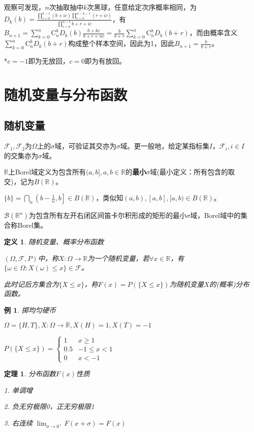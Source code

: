 \documentclass[a4paper,UTF8,fontset=windows]{ctexart}
\newtheorem{thm}{定理}[section]
\newtheorem{exmp}{例}[section]
\newtheorem{defi}{定义}[section]
\begin{document}
观察可发现，$n$次抽取抽中$k$次黑球，任意给定次序概率相同，为$D_k(b)=\frac{\prod_{i=0}^{k-1}(b+ic)\prod_{i=0}^{n-k-1}(r+ic)}{\prod_{i=0}^{n-1}b+r+ic}$，有$B_{n+1}=\sum_{k=0}^n\mathrm{C}_n^kD_k(b)\frac{b+kc}{b+r+nc}=\frac{b}{b+r}\sum_{k=0}^n\mathrm{C}_n^kD_k(b+r)$，而由概率含义$\sum_{k=0}^n\mathrm{C}_n^kD_k(b+r)$构成整个样本空间，因此为1，因此$B_{n+1}=\frac{b}{b+r}$。

*$c=-1$即为无放回，$c=0$即为有放回。

\section{随机变量与分布函数}
\subsection{随机变量}
$\mathcal{F}_1,\mathcal{F}_2$为$\Omega$上的$\sigma$域，可验证其交亦为$\sigma$域。更一般地，给定某指标集$I$，$\mathcal{F}_i,i\in I$的交集亦为$\sigma$域。

$\mathbb{R}$上Borel域定义为包含所有$(a,b],a,b\in\mathbb{R}$的\textbf{最小}$\sigma$域(最小定义：所有包含的取交)，记为$B(\mathbb{R})$。

$\{b\}=\bigcap_n\left(b-\frac{1}{n},b\right]\in B(\mathbb{R})$，类似知$(a,b),[a,b],[a,b)\in B(\mathbb{R})$。

$\mathcal{B}(\mathbb{R}^n)$为包含所有左开右闭区间笛卡尔积形成的矩形的最小$\sigma$域，Borel域中的集合称Borel集。

\begin{defi} 随机变量、概率分布函数
	
$(\Omega,\mathcal{F},P)$中，称$X:\Omega\to\mathbb{R}$为一个随机变量，若$\forall x\in\mathbb{R}$，有$\{\omega\in\Omega:X(\omega)\le x\}\in\mathcal{F}$。

此时记后方集合为$\{X\le x\}$，称$F(x)=P(\{X\le x\})$为随机变量$X$的(概率)分布函数。
\end{defi}

\begin{exmp} 掷均匀硬币
	
$\Omega=\{H,T\},X:\Omega\to\mathbb{R},X(H)=1,X(T)=-1$

$P(\{X\le x\})=\begin{cases}1&x\ge1\\0.5&-1\le x<1\\0&x<-1\end{cases}$
\end{exmp}

\begin{thm} 分布函数$F(x)$性质

1. 单调增

2. 负无穷极限0，正无穷极限1

3. 右连续 $\lim_{\sigma\to0^+}F(x+\sigma)=F(x)$
\end{thm}
\end{document}
